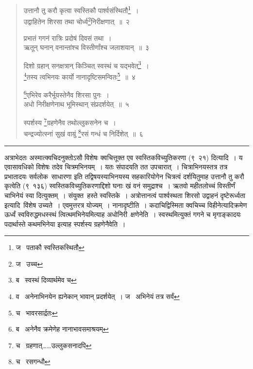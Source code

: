\documentclass[11pt, openany]{book}
\begin{document}
\newpage
{}

\begin{quote}
{\na उत्तानौ तु करौ कृत्वा स्वस्तिकौ पार्श्वसंस्थितौ\renewcommand{\thefootnote}{1}\footnote{ज \textendash\  पताकौ स्वस्तिकस्थितौ}~।\\
उद्वाहितेन शिरसा तथा चोर्ध्व\renewcommand{\thefootnote}{2}\footnote{ज \textendash\  उच्च}निरीक्षणात्~॥~२

प्रभातं गगनं रात्रिः प्रदोषं दिवसं तथा~।\\
ऋतून् घनान् वनान्तांश्च विस्तीर्णांश्च जलाशयान्~॥~३

दिशो ग्रहान् सनक्षत्रान् किञ्चित् स्वस्थं च यद्भवेत्\renewcommand{\thefootnote}{3}\footnote{ब \textendash\  स्वस्थं दिव्यार्थमेव च}~।\\
\renewcommand{\thefootnote}{4}\footnote{व \textendash\  अनेनाभिनयेन ह्यनेकान् भावान् प्रदर्शयेत्~। ज \textendash\  अभिनेयं तत्र सर्वं}तस्य त्वभिनयः कार्यो नानादृष्टिसमन्वितः\renewcommand{\thefootnote}{5}\footnote{च \textendash\  भावरसार्द्रतः}~॥~४

\renewcommand{\thefootnote}{6}\footnote{ब \textendash\  अनेनैव क्रमेणेह नानाभावसमाश्रयम्}एभिरेव करैर्भूयस्तेनैव शिरसा पुनः~।\\
अधो निरीक्षणेनाथ भूमिस्थान् संप्रदर्शयेत्~॥~५

स्पर्शस्य \renewcommand{\thefootnote}{7}\footnote{च \textendash\  ग्रहणात्\ldots \ldots उल्लुकसनादपि}ग्रहणेनैव तथोल्लुकसनेन च~।\\
चन्द्रज्योत्स्नां सुखं वायुं \renewcommand{\thefootnote}{8}\footnote{च \textendash\  रसगन्धौ}रसं गन्धं च निर्दिशेत्~॥~६}
\end{quote}

\hrule

\vspace{2mm}
\noindent
अत्राभेदतः अस्मात्क्वचिदनुक्तोऽसौ विशेषः क्वचित्तूक्त एव {\qt स्वस्तिकविच्युतिकरणा} (९\textendash\ २१) दित्यादि~। य एवासावधिको विशेषः तदेव चित्रमभिनयम्~। यतः संपादयति तत उपचारात्~। चित्राभिनयस्तत्र तत्र प्रभातादयः सर्वलोक\textendash\ साधारणा इति तद्विषयस्याभिनयस्य सहकारियोगेन चित्रत्वं दर्शयितुमाह उत्तानौ तु करौ कृत्वेति (९\textendash\  १३६) {\qt स्वस्तिकविच्युतिकरणाद्दिशो घनाः खं वनं समुद्राश्च~। ऋतवो महीतलोच्चं विस्तीर्णं चाभिनेयं स्या} दित्युक्तम्~। संयुक्त\textendash\ हस्ते स्वस्तिके~। अत्रोत्तानत्वं पार्श्वस्थता शिरसो उद्वाहनं दृष्टेरूर्ध्वता इत्यादि\textendash\ विंशेष उच्यते~। एवमुत्तरत्र योज्यम्~। नानादृष्टीति~। कदाचिद्विस्मिता क्वचिच्च विहीनेत्यादिक्रमेण ऊर्ध्वं स्वविरुद्धमधस्स्थं त्वित्थमभिनेयमित्याह अधोनिरी\textendash\ क्षणेनेति~। स्वस्थमित्युक्तं गगने च मृगाङ्कादयः पदार्थास्ते कथमभिनेया इत्याह स्पर्शस्य ग्रहणेनैवेति~।
\end{document}

